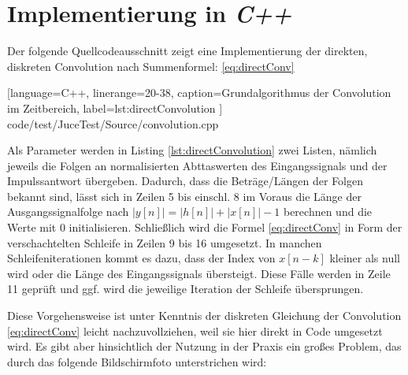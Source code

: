 \section{Implementierung in \textit{C++}}
\label{sec:implementation}

Der folgende Quellcodeausschnitt zeigt eine Implementierung der direkten, diskreten Convolution
nach Summenformel: \ref{eq:directConv}




[language=C++, linerange={20-38}, caption={Grundalgorithmus der Convolution im Zeitbereich},
label={lst:directConvolution}
]
{code/test/JuceTest/Source/convolution.cpp}

Als Parameter werden in Listing \ref{lst:directConvolution} zwei Listen, nämlich jeweils die Folgen
an normalisierten Abttaswerten des Eingangssignals und der Impulssantwort übergeben.
Dadurch, dass die Beträge/Längen der Folgen bekannt sind, lässt sich in Zeilen 5 bis einschl. 8
im Voraus die Länge der Ausgangssignalfolge nach $|y[n]| = |h[n]| + |x[n]| - 1$ berechnen und die Werte mit 0 initialisieren.
Schließlich wird die Formel \ref{eq:directConv} in Form der verschachtelten Schleife
in Zeilen 9 bis 16 umgesetzt. In manchen Schleifeniterationen kommt es dazu, dass der Index von $x[n - k]$
kleiner als null wird oder die Länge des Eingangssignals übersteigt. Diese Fälle werden in Zeile 11 geprüft und
ggf. wird die jeweilige Iteration der Schleife übersprungen.

Diese Vorgehensweise ist unter Kenntnis der diskreten Gleichung der Convolution \ref{eq:directConv}
leicht nachzuvollziehen, weil sie hier direkt in Code umgesetzt wird.
Es gibt aber hinsichtlich der Nutzung in der Praxis ein großes Problem, das durch das folgende
Bildschirmfoto unterstrichen wird:

